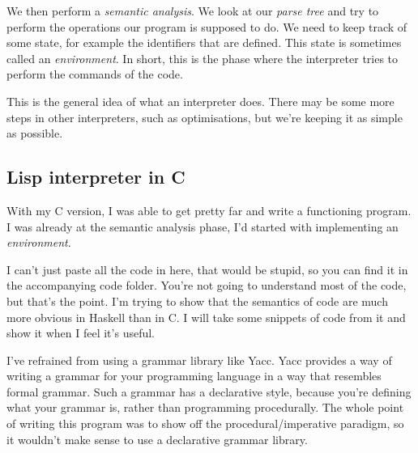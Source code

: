 \documentclass[11pt]{article}
\begin{document}
We then perform a \emph{semantic analysis}. We look at our \emph{parse tree}
and try to perform the operations our program is supposed to do. We need to
keep track of some state, for example the identifiers that are defined. This
state is sometimes called an \emph{environment}. In short, this is the phase
where the interpreter tries to perform the commands of the code.

This is the general idea of what an interpreter does. There may be some more
steps in other interpreters, such as optimisations, but we're keeping it as
simple as possible.

\subsection{Lisp interpreter in C}

With my C version, I was able to get pretty far and write a functioning
program. I was already at the semantic analysis phase, I'd started with
implementing an \emph{environment}.

I can't just paste all the code in here, that would be stupid, so you can find
it in the accompanying code folder. You're not going to understand most of the
code, but that's the point. I'm trying to show that the semantics of code are
much more obvious in Haskell than in C. I will take some snippets of code from
it and show it when I feel it's useful.

I've refrained from using a grammar library like Yacc. Yacc provides a way of
writing a grammar for your programming language in a way that resembles formal
grammar. Such a grammar has a declarative style, because you're defining what
your grammar is, rather than programming procedurally. The whole point of
writing this program was to show off the procedural/imperative paradigm, so it
wouldn't make sense to use a declarative grammar library.
\end{document}
